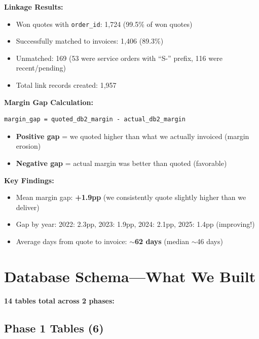 \documentclass[11pt,a4paper]{article}
\newcommand{\pp}{pp}
\newcommand{\code}[1]{\texttt{#1}}
\begin{document}
\textbf{Linkage Results:}
\begin{itemize}[nosep]
  \item Won quotes with \code{order\_id}: 1{,}724 (99.5\% of won quotes)
  \item Successfully matched to invoices: 1{,}406 (89.3\%)
  \item Unmatched: 169 (53 were service orders with ``S-'' prefix, 116 were recent/pending)
  \item Total link records created: 1{,}957
\end{itemize}

\textbf{Margin Gap Calculation:}
\begin{lstlisting}
margin_gap = quoted_db2_margin - actual_db2_margin
\end{lstlisting}

\begin{itemize}[nosep]
  \item \textbf{Positive gap} = we quoted higher than what we actually invoiced (margin erosion)
  \item \textbf{Negative gap} = actual margin was better than quoted (favorable)
\end{itemize}

\textbf{Key Findings:}
\begin{itemize}[nosep]
  \item Mean margin gap: \textbf{+1.9\pp{}} (we consistently quote slightly higher than we deliver)
  \item Gap by year: 2022: 2.3\pp{}, 2023: 1.9\pp{}, 2024: 2.1\pp{}, 2025: 1.4\pp{} (improving!)
  \item Average days from quote to invoice: \textbf{$\sim$62 days} (median $\sim$46 days)
\end{itemize}

\section{Database Schema---What We Built}

\textbf{14 tables total across 2 phases:}

\subsection{Phase 1 Tables (6)}
\end{document}
